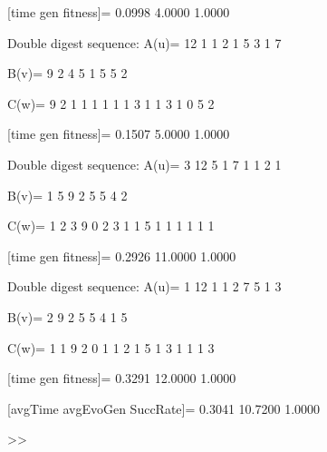 [time gen fitness]=
    0.0998    4.0000    1.0000

Double digest sequence:
A(u)=
    12     1     1     2     1     5     3     1     7

B(v)=
     9     2     4     5     1     5     5     2

C(w)=
     9     2     1     1     1     1     1     1     3     1     1     3     1     0     5     2

[time gen fitness]=
    0.1507    5.0000    1.0000

Double digest sequence:
A(u)=
     3    12     5     1     7     1     1     2     1

B(v)=
     1     5     9     2     5     5     4     2

C(w)=
     1     2     3     9     0     2     3     1     1     5     1     1     1     1     1     1

[time gen fitness]=
    0.2926   11.0000    1.0000

Double digest sequence:
A(u)=
     1    12     1     1     2     7     5     1     3

B(v)=
     2     9     2     5     5     4     1     5

C(w)=
     1     1     9     2     0     1     1     2     1     5     1     3     1     1     1     3

[time gen fitness]=
    0.3291   12.0000    1.0000

[avgTime  avgEvoGen  SuccRate]=
    0.3041   10.7200    1.0000

>> 